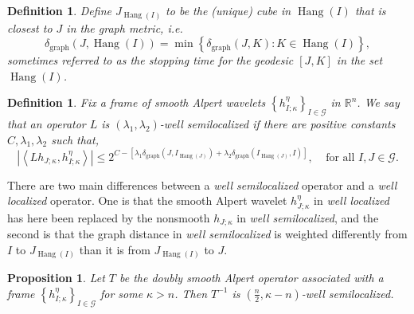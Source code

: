 \documentclass{amsart}%
\theoremstyle{plain}
\newtheorem{definition}[theorem]{Definition}
\newtheorem{proposition}[theorem]{Proposition}
\numberwithin{equation}{section}
\begin{document}
\begin{definition}
Define $J_{\operatorname*{Hang}\left(  I\right)  }$ to be the (unique) cube in
$\operatorname*{Hang}\left(  I\right)  $ that is closest to $J$ in the graph
metric, i.e.
\[
\delta_{\operatorname*{graph}}\left(  J,\operatorname*{Hang}\left(  I\right)
\right)  =\min\left\{  \delta_{\operatorname*{graph}}\left(  J,K\right)
:K\in\operatorname*{Hang}\left(  I\right)  \right\}  ,
\]
sometimes referred to as the stopping time for the geodesic $\left[
J,K\right]  $ in the set $\operatorname*{Hang}\left(  I\right)  $.
\end{definition}

\begin{definition}
Fix a frame of smooth Alpert wavelets $\left\{  h_{I;\kappa}^{\eta}\right\}
_{I\in\mathcal{G}}$ in $\mathbb{R}^{n}$. We say that an operator $L$ is
$\left(  \lambda_{1},\lambda_{2}\right)  $\emph{-well semilocalized} if there
are positive constants $C,\lambda_{1},\lambda_{2}$ such that,
\[
\left\vert \left\langle Lh_{J;\kappa},h_{I;\kappa}^{\eta}\right\rangle
\right\vert \leq2^{C-\left[  \lambda_{1}\delta_{\operatorname*{graph}}\left(
J,I_{\operatorname*{Hang}\left(  J\right)  }\right)  +\lambda_{2}%
\delta_{\operatorname*{graph}}\left(  I_{\operatorname*{Hang}\left(  J\right)
},I\right)  \right]  },\ \ \ \ \ \text{for all }I,J\in\mathcal{G}.
\]

\end{definition}

There are two main differences between a \emph{well semilocalized} operator
and a \emph{well localized} operator. One is that the smooth Alpert wavelet
$h_{J;\kappa}^{\eta}$ in \emph{well localized} has here been replaced by the
nonsmooth $h_{J;\kappa}$ in \emph{well semilocalized}, and the second is that
the graph distance in \emph{well semilocalized} is weighted differently from
$I$ to $J_{\operatorname*{Hang}\left(  I\right)  }$ than it is from
$J_{\operatorname*{Hang}\left(  I\right)  }$ to $J$.

\begin{proposition}
\label{T inv well semi}Let $T$ be the doubly smooth Alpert operator associated
with a frame $\left\{  h_{I;\kappa}^{\eta}\right\}  _{I\in\mathcal{G}}$ for
some $\kappa>n$. Then $T^{-1}$ is $\left(  \frac{n}{2},\kappa-n\right)  $-well semilocalized.
\end{proposition}
\end{document}

